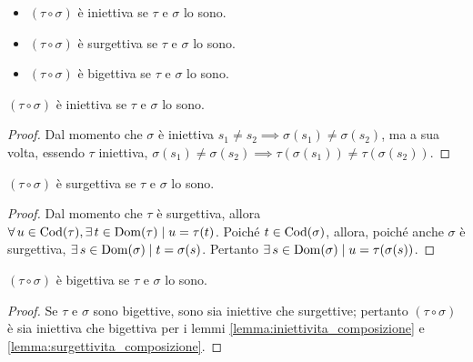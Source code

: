 \begin{itemize}
    \item $(\tau \circ \sigma)$ è iniettiva se $\tau$ e $\sigma$ lo sono.
    \item $(\tau \circ \sigma)$ è surgettiva se $\tau$ e $\sigma$ lo sono.
    \item $(\tau \circ \sigma)$ è bigettiva se $\tau$ e $\sigma$ lo sono.
\end{itemize}

\begin{lemma}
    \label{lemma:iniettivita_composizione}
    $(\tau \circ \sigma)$ è iniettiva se $\tau$ e $\sigma$ lo sono.
\end{lemma}

\begin{proof}
    Dal momento che $\sigma$ è iniettiva $s_1 \neq s_2 \implies \sigma(s_1) \neq \sigma(s_2)$,
    ma a sua volta, essendo $\tau$ iniettiva, $\sigma(s_1) \neq \sigma(s_2) \implies
        \tau(\sigma(s_1)) \neq \tau(\sigma(s_2))$.
\end{proof}

\begin{lemma}
    \label{lemma:surgettivita_composizione}
    $(\tau \circ \sigma)$ è surgettiva se $\tau$ e $\sigma$ lo sono.
\end{lemma}

\begin{proof}
    Dal momento che $\tau$ è surgettiva, allora $\forall u \in
    \Codom(\tau), \exists t \in \Dom(\tau) \mid u = \tau(t)$.
    Poiché $t \in \operatorname{Cod}(\sigma)$, allora, poiché anche
    $\sigma$ è surgettiva, $\exists s \in \Dom(\sigma) \mid
        t = \sigma(s)$. Pertanto $\exists s \in \Dom(\sigma) \mid
        u = \tau(\sigma(s))$. 
\end{proof}

\begin{lemma}
    \label{lemma:bigettivita_composizione}
    $(\tau \circ \sigma)$ è bigettiva se $\tau$ e $\sigma$ lo sono.
\end{lemma}

\begin{proof}
    Se $\tau$ e $\sigma$ sono bigettive, sono sia iniettive che surgettive;
    pertanto $(\tau \circ \sigma)$ è sia iniettiva che bigettiva per i
    lemmi \ref{lemma:iniettivita_composizione} e
    \ref{lemma:surgettivita_composizione}.
\end{proof}

